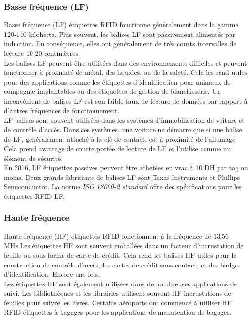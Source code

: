 \documentclass[11pt, a4paper, twoside]{book}
\begin{document}
\subsubsection{Basse fréquence (LF)}
Basse fréquence (LF) étiquettes RFID fonctionne généralement dans la gamme 120-140 kilohertz. Plus souvent, les balises LF sont passivement alimentés par induction. En conséquence, elles ont généralement de très courts intervalles de lecture 10-20 centimètres.\\

Les balises LF peuvent être utilisées dans des environnements difficiles et peuvent fonctionner à proximité de métal, des liquides, ou de la saleté. Cela les rend utiles pour des applications comme les étiquettes d'identification pour animaux de compagnie implantables ou des étiquettes de gestion de blanchisserie. Un inconvénient de balises LF est son faible taux de lecture de données par rapport à d'autres fréquences de fonctionnement.\\

LF balises sont souvent utilisées dans les systèmes d'immobilisation de voiture et de contrôle d'accès. Dans ces systèmes, une voiture ne démarre que si une balise de LF, généralement attaché à la clé de contact, est à proximité de l'allumage. Cela prend avantage de courte portée de lecture de LF et l'utilise comme un élément de sécurité.\\

En 2016, LF étiquettes passives peuvent être achetées en vrac à 10 DH par tag ou moins. Deux grands fabricants de balises LF sont Texas Instruments et Phillips Semiconductor. La norme \emph{ISO 18000-2 standard} offre des spécifications pour les étiquettes RFID LF.

\subsubsection{Haute fréquence}
Haute fréquence (HF) étiquettes RFID fonctionnent à la fréquence de 13,56 MHz.Les étiquettes HF sont souvent emballées dans un facteur d'incrustation de feuille ou sous forme de carte de crédit. Cela rend les balises HF utiles pour la construction de contrôle d'accès, les cartes de crédit sans contact, et des badges d'identification. Encore une fois.\\

Les étiquettes HF sont également utilisées dans de nombreuses applications de suivi. Les bibliothèques et les librairies utilisent souvent HF incrustations de feuilles pour suivre les livres. Certains aéroports ont commencé à utiliser HF RFID étiquettes à bagages pour les applications de manutention de bagages.\\
\end{document}
